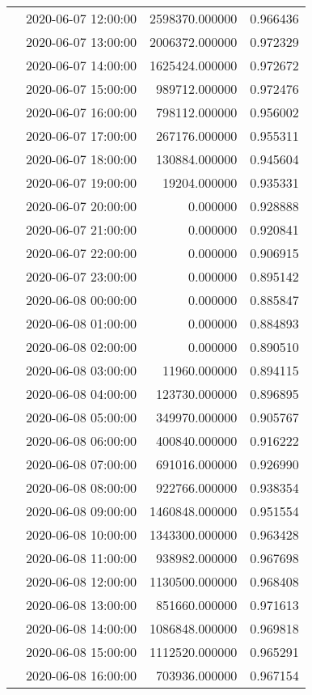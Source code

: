 \begin{tabular}{llrr}
 & 2020-06-07 12:00:00 & 2598370.000000 & 0.966436 \\
 & 2020-06-07 13:00:00 & 2006372.000000 & 0.972329 \\
 & 2020-06-07 14:00:00 & 1625424.000000 & 0.972672 \\
 & 2020-06-07 15:00:00 & 989712.000000 & 0.972476 \\
 & 2020-06-07 16:00:00 & 798112.000000 & 0.956002 \\
 & 2020-06-07 17:00:00 & 267176.000000 & 0.955311 \\
 & 2020-06-07 18:00:00 & 130884.000000 & 0.945604 \\
 & 2020-06-07 19:00:00 & 19204.000000 & 0.935331 \\
 & 2020-06-07 20:00:00 & 0.000000 & 0.928888 \\
 & 2020-06-07 21:00:00 & 0.000000 & 0.920841 \\
 & 2020-06-07 22:00:00 & 0.000000 & 0.906915 \\
 & 2020-06-07 23:00:00 & 0.000000 & 0.895142 \\
 & 2020-06-08 00:00:00 & 0.000000 & 0.885847 \\
 & 2020-06-08 01:00:00 & 0.000000 & 0.884893 \\
 & 2020-06-08 02:00:00 & 0.000000 & 0.890510 \\
 & 2020-06-08 03:00:00 & 11960.000000 & 0.894115 \\
 & 2020-06-08 04:00:00 & 123730.000000 & 0.896895 \\
 & 2020-06-08 05:00:00 & 349970.000000 & 0.905767 \\
 & 2020-06-08 06:00:00 & 400840.000000 & 0.916222 \\
 & 2020-06-08 07:00:00 & 691016.000000 & 0.926990 \\
 & 2020-06-08 08:00:00 & 922766.000000 & 0.938354 \\
 & 2020-06-08 09:00:00 & 1460848.000000 & 0.951554 \\
 & 2020-06-08 10:00:00 & 1343300.000000 & 0.963428 \\
 & 2020-06-08 11:00:00 & 938982.000000 & 0.967698 \\
 & 2020-06-08 12:00:00 & 1130500.000000 & 0.968408 \\
 & 2020-06-08 13:00:00 & 851660.000000 & 0.971613 \\
 & 2020-06-08 14:00:00 & 1086848.000000 & 0.969818 \\
 & 2020-06-08 15:00:00 & 1112520.000000 & 0.965291 \\
 & 2020-06-08 16:00:00 & 703936.000000 & 0.967154 \\

\end{tabular}
